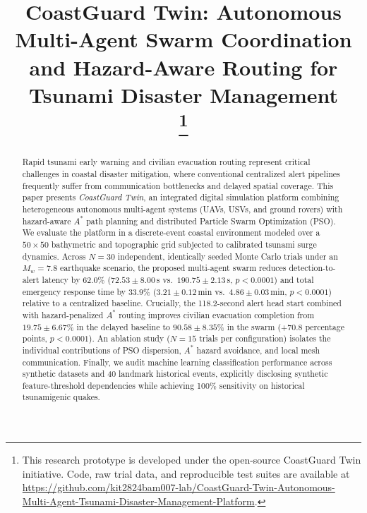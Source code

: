 \documentclass[conference]{IEEEtran}
\begin{document}
\title{CoastGuard Twin: Autonomous Multi-Agent Swarm Coordination and Hazard-Aware Routing for Tsunami Disaster Management\\
\thanks{This research prototype is developed under the open-source CoastGuard Twin initiative. Code, raw trial data, and reproducible test suites are available at \url{https://github.com/kit2824bam007-lab/CoastGuard-Twin-Autonomous-Multi-Agent-Tsunami-Disaster-Management-Platform}.}
}

\author{
}

\maketitle

\begin{abstract}
Rapid tsunami early warning and civilian evacuation routing represent critical challenges in coastal disaster mitigation, where conventional centralized alert pipelines frequently suffer from communication bottlenecks and delayed spatial coverage. This paper presents \textit{CoastGuard Twin}, an integrated digital simulation platform combining heterogeneous autonomous multi-agent systems (UAVs, USVs, and ground rovers) with hazard-aware $A^*$ path planning and distributed Particle Swarm Optimization (PSO). We evaluate the platform in a discrete-event coastal environment modeled over a $50 \times 50$ bathymetric and topographic grid subjected to calibrated tsunami surge dynamics. Across $N = 30$ independent, identically seeded Monte Carlo trials under an $M_w = 7.8$ earthquake scenario, the proposed multi-agent swarm reduces detection-to-alert latency by 62.0\% ($72.53 \pm 8.00$\,s vs.\ $190.75 \pm 2.13$\,s, $p < 0.0001$) and total emergency response time by 33.9\% ($3.21 \pm 0.12$\,min vs.\ $4.86 \pm 0.03$\,min, $p < 0.0001$) relative to a centralized baseline. Crucially, the 118.2-second alert head start combined with hazard-penalized $A^*$ routing improves civilian evacuation completion from $19.75 \pm 6.67\%$ in the delayed baseline to $90.58 \pm 8.35\%$ in the swarm (+70.8 percentage points, $p < 0.0001$). An ablation study ($N = 15$ trials per configuration) isolates the individual contributions of PSO dispersion, $A^*$ hazard avoidance, and local mesh communication. Finally, we audit machine learning classification performance across synthetic datasets and 40 landmark historical events, explicitly disclosing synthetic feature-threshold dependencies while achieving 100\% sensitivity on historical tsunamigenic quakes.
\end{abstract}
\end{document}
